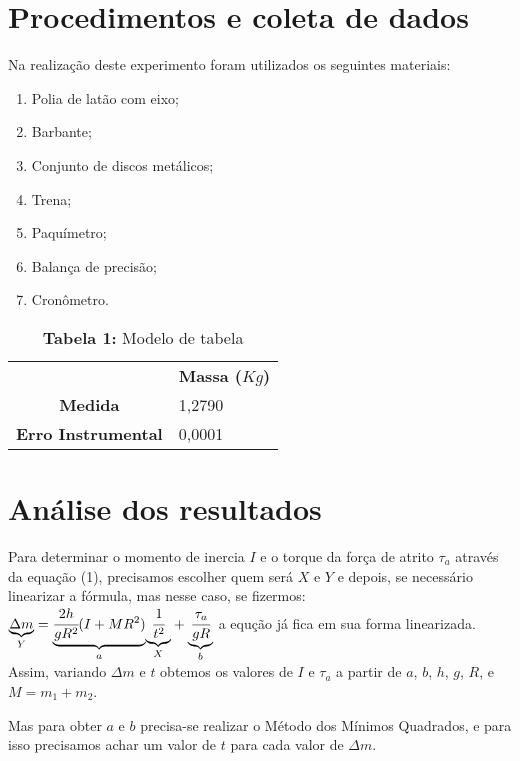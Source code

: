 \documentclass{article}
\begin{document}
\section{Procedimentos e coleta de dados}

Na realização deste experimento foram utilizados os seguintes materiais: 
\begin{enumerate} 
	\item Polia de latão com eixo;
	\item Barbante;
	\item Conjunto de discos metálicos;
	\item Trena;
	\item Paquímetro;
	\item Balança de precisão;
	\item Cronômetro.
 \end {enumerate} 

\begin{table}[!ht]
	\begin{center}
		\caption*{\textbf{Tabela 1:} Modelo de tabela}
		\begin{tabular}{| l | l |}
			\cline{2-2} \multicolumn{0}{c|}{ } & \multicolumn{1}{c|}{\textbf{Massa ($Kg$)}} \\  \cline{1-2}
			\multicolumn{0}{|c|}{\textbf{Medida}} & 1,2790\\ \hline
			\multicolumn{0}{|c|}{\textbf{Erro Instrumental}} & 0,0001\\ \hline
		\end{tabular}
	\end{center}
\end{table}

\section{Análise dos resultados}
Para determinar o momento de inercia $I$ e o torque da força de atrito
$\tau_{a}$ através da equação (1), precisamos escolher quem será
$X$ e $Y$ e depois, se necessário linearizar a fórmula, mas nesse
caso, se fizermos: $\underset{Y}{\underbrace{\Delta m}}=\underset{a}{\underbrace{\cfrac{2h}{gR^{2}}(I+MR^{2})}}\underset{X}{\underbrace{\ensuremath{\cfrac{1}{t^{2}}}}}+\underset{b}{\underbrace{\cfrac{\tau_{a}}{gR}}}$
a equção já fica em sua forma linearizada. Assim, variando $\Delta m$
e $t$ obtemos os valores de $I$ e $\tau_{a}$ a partir de $a$,
$b$, $h$, $g$, $R$, e $M=m_{1}+m_{2}$.

Mas para obter $a$ e $b$ precisa-se realizar o Método dos Mínimos
Quadrados, e para isso precisamos achar um valor de $t$ para cada
valor de $\Delta m$.
\end{document}

